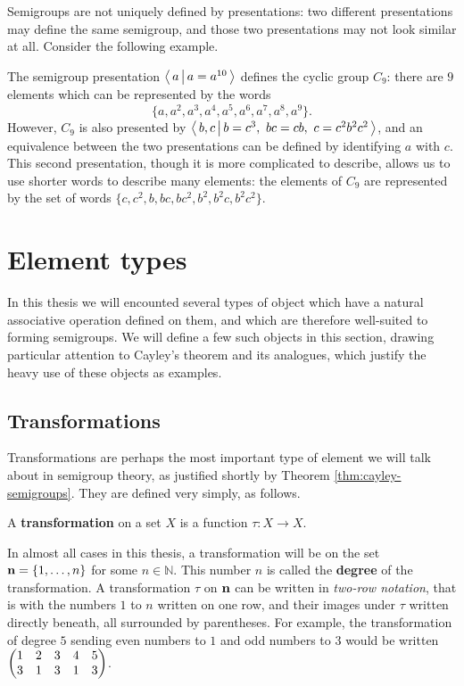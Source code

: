 Semigroups are not uniquely defined by presentations: two different
presentations may define the same semigroup, and those two presentations may not
look similar at all.  Consider the following example.

\begin{example}
  The semigroup presentation $\left\langle\,a\,\middle|\,a=a^{10}\,\right\rangle$ defines the cyclic group
  $C_9$: there are $9$ elements which can be represented by the words
  $$\{a, a^2, a^3, a^4, a^5, a^6, a^7, a^8, a^9\}.$$  However, $C_9$ is also
  presented by $\pres{b,c}{b=c^3,\ bc=cb,\ c=c^2b^2c^2}$, and an equivalence
  between the two presentations can be defined by identifying $a$ with $c$.
  This second presentation, though it is more complicated to describe, allows us
  to use shorter words to describe many elements: the elements of $C_9$ are
  represented by the set of words $\{c, c^2, b, bc, bc^2, b^2, b^2c, b^2c^2\}$.
\end{example}

\section{Element types}
\label{sec:element-types}

In this thesis we will encounted several types of object which have a natural
associative operation defined on them, and which are therefore well-suited to
forming semigroups.  We will define a few such objects in this section, drawing
particular attention to Cayley's theorem and its analogues, which justify the
heavy use of these objects as examples.

\subsection{Transformations}
\label{sec:transformations}

Transformations are perhaps the most important type of element we will talk
about in semigroup theory, as justified shortly by Theorem
\ref{thm:cayley-semigroups}.  They are defined very simply, as follows.

\begin{definition}
  \label{def:transformation}
  A \textbf{transformation} on a set $X$ is a function $\tau: X \to X$.
\end{definition}

In almost all cases in this thesis, a transformation will be on the set
$\mathbf{n} = \{1, \ldots, n\}$ for some $n \in \mathbb{N}$.  This number $n$ is called
the \textbf{degree} of the transformation.  A transformation
$\tau$ on $\mathbf{n}$ can be written in \textit{two-row notation},  that is with the numbers $1$ to $n$ written on one row, and their
images under $\tau$ written directly beneath, all surrounded by parentheses.
For example, the transformation of degree $5$ sending even numbers to $1$ and
odd numbers to $3$ would be written $\begin{pmatrix} 1 & 2 & 3 & 4 & 5 \\ 3 & 1 & 3 & 1 & 3 \end{pmatrix}$.

